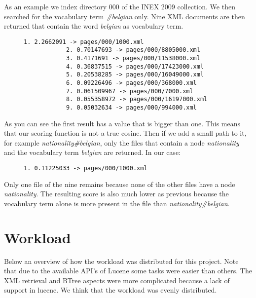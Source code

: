 \documentclass{article}
\begin{document}
As an example we index directory 000 of the INEX 2009 collection.
We then searched for the vocabulary term \emph{\#belgian} only. Nine XML documents are then returned that contain the word \emph{belgian} as vocabulary term.
\begin{figure}[H]
	\begin{minipage}{0.5\textwidth}
		\centering
		\begin{lstlisting}[basicstyle=\tiny\ttfamily, caption={High threshold}]
			1. 2.2662091 -> pages/000/1000.xml
			2. 0.70147693 -> pages/000/8805000.xml
			3. 0.4171691 -> pages/000/11538000.xml
			4. 0.36837515 -> pages/000/17423000.xml
			5. 0.20538285 -> pages/000/16049000.xml
			6. 0.09226496 -> pages/000/368000.xml
			7. 0.061509967 -> pages/000/7000.xml
			8. 0.055358972 -> pages/000/16197000.xml
			9. 0.05032634 -> pages/000/994000.xml
		\end{lstlisting}
	\end{minipage}
\end{figure}
As you can see the first result has a value that is bigger than one. This means that our scoring function is not a true cosine.
Then if we add a small path to it, for example \emph{nationality\#belgian}, only the files that contain a node \emph{nationality} and the vocabulary term \emph{belgian}
are returned.
In our case:
\begin{figure}[H]
	\begin{minipage}{0.5\textwidth}
		\centering
		\begin{lstlisting}[basicstyle=\tiny\ttfamily, caption={High threshold}]
			1. 0.11225033 -> pages/000/1000.xml
		\end{lstlisting}
	\end{minipage}
\end{figure}
Only one file of the nine remains because none of the other files have a node \emph{nationality}.
The resulting score is also much lower as previous because the vocabulary term alone is more present in the file than \emph{nationality\#belgian}.

\section{Workload}
Below an overview of how the workload was distributed for this project. Note that due to the available API's of Lucene some tasks were easier than others. The XML retrieval and BTree aspects were more complicated because a lack of support in lucene. We think that the workload was evenly distributed.
\end{document}
